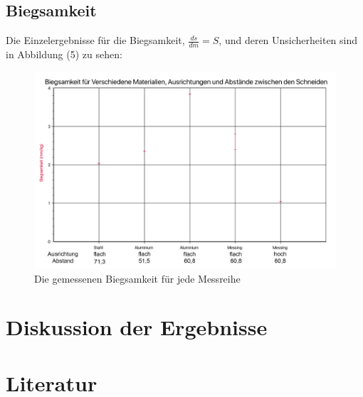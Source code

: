 \documentclass[11pt,a4paper]{article}
\begin{document}
\subsection{Biegsamkeit}
Die Einzelergebnisse für die Biegsamkeit, $\frac{ds}{dm} = S$, und deren Unsicherheiten sind in Abbildung (5) zu sehen:

\begin{figure}[h]
	\centering
	\includegraphics[width=\linewidth]{Abb5}
	\caption{Die gemessenen Biegsamkeit für jede Messreihe}
\end{figure}


\section{Diskussion der Ergebnisse}

\section{Literatur}
	
	
	
	
	
	
	
	
\end{document}

